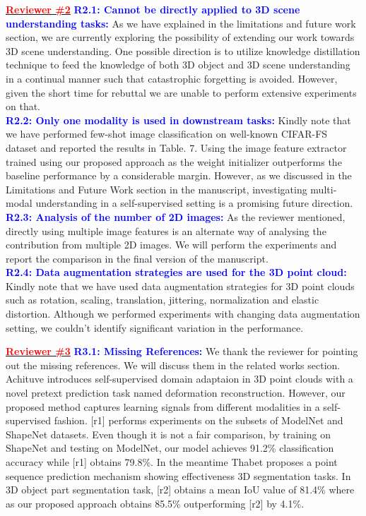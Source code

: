 \documentclass[10pt,twocolumn,letterpaper]{article}
\begin{document}
\noindent \underline{\textcolor{red}{\textbf{Reviewer \#2}}} \textcolor{blue}{\textbf{R2.1: Cannot be directly applied to 3D scene understanding tasks:}} As we have explained in the limitations and future work section, we are currently exploring the possibility of extending our work towards 3D scene understanding. One possible direction is to utilize knowledge distillation technique to feed the knowledge of both 3D object and 3D scene understanding in a continual manner such that catastrophic forgetting is avoided. However, given the short time for rebuttal we are unable to perform extensive experiments on that.\\ \textcolor{blue}{\textbf{R2.2: Only one modality is used in downstream tasks:}} Kindly note that we have performed few-shot image classification on well-known CIFAR-FS dataset and reported the results in Table. 7. Using the image feature extractor trained using our proposed approach as the weight initializer outperforms the baseline performance by a considerable margin. However, as we discussed in the Limitations and Future Work section in the manuscript, investigating multi-modal understanding in a self-supervised setting is a promising future direction.\\
\textcolor{blue}{\textbf{R2.3: Analysis of the number of 2D images:}} As the reviewer mentioned, directly using multiple image features is an alternate way of analysing the contribution from multiple 2D images. We will perform the experiments and report the comparison in the final version of the manuscript.\\
\textcolor{blue}{\textbf{R2.4: Data augmentation strategies are used for the 3D point cloud:}} Kindly note that we have used data augmentation strategies for 3D point clouds such as rotation, scaling, translation, jittering, normalization and elastic distortion. Although we performed experiments with changing data augmentation setting, we couldn't identify significant variation in the performance.

\noindent \underline{\textcolor{red}{\textbf{Reviewer \#3}}} \textcolor{blue}{\textbf{R3.1: Missing References:}} We thank the reviewer for pointing out the missing references. We will discuss them in the related works section. Achituve \etal [r1] introduces self-supervised domain adaptaion in 3D point clouds with a novel pretext prediction task named deformation reconstruction. However, our proposed method captures learning signals from different modalities in a self-supervised fashion. [r1] performs experiments on the subsets of ModelNet and ShapeNet datasets. Even though it is not a fair comparison, by training on ShapeNet and testing on ModelNet, our model achieves 91.2\% classification accuracy while [r1] obtains 79.8\%. In the meantime Thabet \etal [r2] proposes a point sequence prediction mechanism showing effectiveness 3D segmentation tasks. In 3D object part segmentation task, [r2] obtains a mean IoU value of 81.4\% where as our proposed approach obtains 85.5\% outperforming [r2] by 4.1\%.



{\small


}
\end{document}
